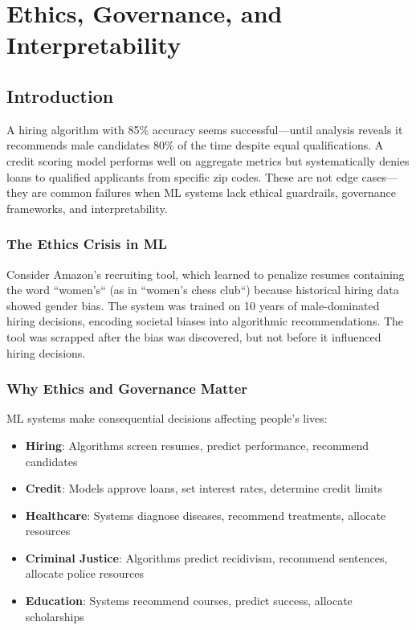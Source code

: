 \chapter{Ethics, Governance, and Interpretability}

\section{Introduction}

A hiring algorithm with 85\% accuracy seems successful---until analysis reveals it recommends male candidates 80\% of the time despite equal qualifications. A credit scoring model performs well on aggregate metrics but systematically denies loans to qualified applicants from specific zip codes. These are not edge cases---they are common failures when ML systems lack ethical guardrails, governance frameworks, and interpretability.

\subsection{The Ethics Crisis in ML}

Consider Amazon's recruiting tool, which learned to penalize resumes containing the word ``women's`` (as in ``women's chess club``) because historical hiring data showed gender bias. The system was trained on 10 years of male-dominated hiring decisions, encoding societal biases into algorithmic recommendations. The tool was scrapped after the bias was discovered, but not before it influenced hiring decisions.

\subsection{Why Ethics and Governance Matter}

ML systems make consequential decisions affecting people's lives:

\begin{itemize}
    \item \textbf{Hiring}: Algorithms screen resumes, predict performance, recommend candidates
    \item \textbf{Credit}: Models approve loans, set interest rates, determine credit limits
    \item \textbf{Healthcare}: Systems diagnose diseases, recommend treatments, allocate resources
    \item \textbf{Criminal Justice}: Algorithms predict recidivism, recommend sentences, allocate police resources
    \item \textbf{Education}: Systems recommend courses, predict success, allocate scholarships
\end{itemize}

